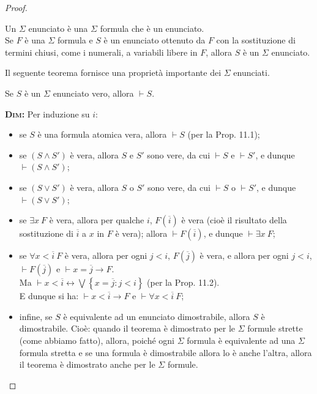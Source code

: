 \begin{proof}
\begin{description}
\begin{defi}
Un $\Sigma$ enunciato è una $\Sigma$ formula che è un enunciato.\\
Se $F$ è una $\Sigma$ formula e $S$ è un enunciato ottenuto da $F$ con la sostituzione di termini chiusi, come i numerali, a variabili libere in $F$, allora $S$ è un $\Sigma$ enunciato.
\end{defi}

\begin{oss}
Il seguente teorema fornisce una proprietà importante dei $\Sigma$ enunciati.
\end{oss}

\begin{thm}
Se $S$ è un $\Sigma$ enunciato vero, allora $\vdash S$. 
\end{thm}

\textsc{\textbf{Dim:}} Per induzione su $i$:
\begin{itemize}
\item se $S$ è una formula atomica vera, allora $\vdash S$ (per la Prop. 11.1);
\item se $\left(S\wedge S'\right)$ è vera, allora $S$ e $S'$ sono vere, da cui $\vdash S$ e $\vdash S'$, e dunque $\vdash \left(S\wedge S'\right)$;
\item se $\left(S\vee S'\right)$ è vera, allora $S$ o $S'$ sono vere, da cui $\vdash S$ o $\vdash S'$, e dunque $\vdash \left(S\vee S'\right)$;
\item se $\exists x\ F$ è vera, allora per qualche $i$, $F\left(\overline i\right)$ è vera (cioè il risultato della sostituzione di $\overline i$ a $x$ in $F$ è vera); allora $\vdash F\left(\overline i\right)$, e dunque $\vdash \exists x\ F$;
\item se $\forall x<\overline {i}\ F$ è vera, allora per ogni $j<i$, $F\left(\overline j\right)$ è vera, e allora per ogni $j<i$, $\vdash F\left(\overline j\right)$ e $\vdash x=\overline j \rightarrow F$.\\
Ma $\vdash x<\overline i\leftrightarrow \bigvee \left\{x=\overline j: j<i\right\}$ (per la Prop. 11.2).\\
E dunque si ha: $\vdash x<\overline i\rightarrow F$ e $\vdash \forall x<\overline {i}\ F$;
\item infine, se $S$ è equivalente ad un enunciato dimostrabile, allora $S$ è dimostrabile. Cioè: quando il teorema è dimostrato per le $\Sigma$ formule strette (come abbiamo fatto), allora, poiché ogni $\Sigma$ formula è equivalente ad una $\Sigma$ formula stretta e se una formula è dimostrabile allora lo è anche l'altra, allora il teorema è dimostrato anche per le $\Sigma$ formule.
\end{itemize}
\end{description}
\end{proof}


